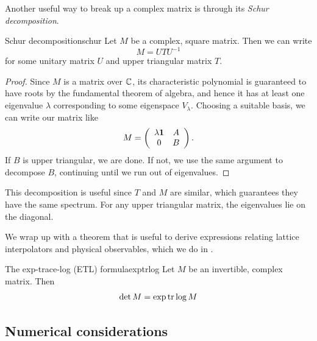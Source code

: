 
Another useful way to break up a complex matrix is through its
{\it Schur decomposition}.
\begin{theorem}{Schur decomposition}{schur}
  Let $M$ be a complex, square matrix.  Then we can write
$$
M=UTU^{-1}
$$
for some unitary matrix $U$ and upper triangular matrix $T$.
\begin{proof}
Since $M$ is a matrix over $\mathbb{C}$, its characteristic polynomial
is guaranteed to have roots by the fundamental theorem of algebra,
and hence it has at least one eigenvalue $\lambda$ corresponding
to some eigenspace $V_\lambda$. Choosing a suitable basis, we
can write our matrix like
$$
M= \left(\begin{array}{cc}
            \lambda{\mathbf 1} & A  \\
            0 & B   \\
            \end{array}\right).
$$
If $B$ is upper triangular, we are done. If not, we use the
same argument to decompose $B$, continuing until we run out
of eigenvalues.
\end{proof}
\end{theorem}
This decomposition is useful since $T$ and $M$ are similar, which
guarantees they have the same spectrum. For any upper triangular
matrix, the eigenvalues lie on the diagonal.

We wrap up with a theorem that is useful to derive expressions relating
lattice interpolators and physical observables,
which we do in .
\begin{theorem}{The exp-trace-log (ETL) formula}{exptrlog}
  Let $M$ be an invertible, complex matrix. Then
  $$\det M = \exp \tr \log M$$
\end{theorem}


\subsection{Numerical considerations}\label{sec:numerics}


